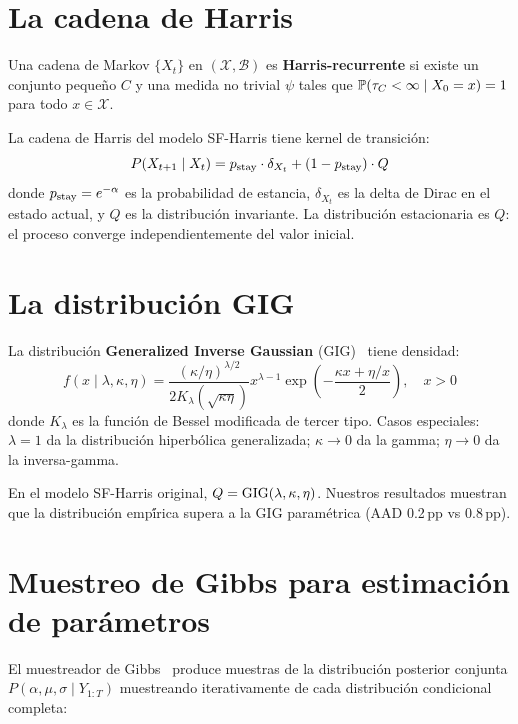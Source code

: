 \section{La cadena de Harris}

\begin{definicion}
Una cadena de Markov $\{X_t\}$ en $(\mathcal{X}, \mathcal{B})$ es \textbf{Harris-recurrente}
si existe un conjunto peque\~{n}o $C$ y una medida no trivial $\psi$ tales que
$\mathbb{P}(\tau_C < \infty \mid X_0 = x) = 1$ para todo $x \in \mathcal{X}$.
\end{definicion}

La cadena de Harris del modelo SF-Harris tiene kernel de transici\'{o}n:
\begin{equation}
    P(X_{t+1} \mid X_t) = p_{\text{stay}} \cdot \delta_{X_t} + (1 - p_{\text{stay}}) \cdot Q
\end{equation}
donde $p_{\text{stay}} = e^{-\alpha}$ es la probabilidad de estancia, $\delta_{X_t}$ es la
delta de Dirac en el estado actual, y $Q$ es la distribuci\'{o}n invariante.
La distribuci\'{o}n estacionaria es $Q$: el proceso converge independientemente del
valor inicial.

\section{La distribuci\'{o}n GIG}

La distribuci\'{o}n \textbf{Generalized Inverse Gaussian} (GIG)~\citep{barndorff1977}
tiene densidad:
\begin{equation}
    f(x \mid \lambda, \kappa, \eta) = \frac{(\kappa/\eta)^{\lambda/2}}{2 K_\lambda(\sqrt{\kappa\eta})} x^{\lambda-1} \exp\left(-\frac{\kappa x + \eta/x}{2}\right), \quad x > 0
\end{equation}
donde $K_\lambda$ es la funci\'{o}n de Bessel modificada de tercer tipo.
Casos especiales: $\lambda = 1$ da la distribuci\'{o}n hiperb\'{o}lica generalizada;
$\kappa \to 0$ da la gamma; $\eta \to 0$ da la inversa-gamma.

En el modelo SF-Harris original, $Q = \operatorname{GIG}(\lambda, \kappa, \eta)$.
Nuestros resultados muestran que la distribuci\'{o}n emp\'{\'i}rica supera a la GIG param\'{e}trica
(AAD 0.2\,pp vs 0.8\,pp).

\section{Muestreo de Gibbs para estimaci\'{o}n de par\'{a}metros}

El muestreador de Gibbs~\citep{chopin2020} produce muestras de la distribuci\'{o}n
posterior conjunta $P(\alpha, \mu, \sigma \mid Y_{1:T})$ muestreando iterativamente
de cada distribuci\'{o}n condicional completa:

